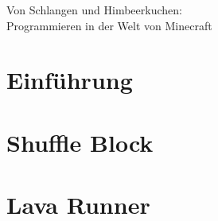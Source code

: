 \documentclass{article}
\begin{document}
	\begin{center}
		\huge Von Schlangen und Himbeerkuchen:\\Programmieren in der Welt von Minecraft
	\end{center}
	\section{Einführung}
		
	\section{Shuffle Block}
		\subsection{}
		
		\subsection{}
		
	\section{Lava Runner}
		
\end{document}
